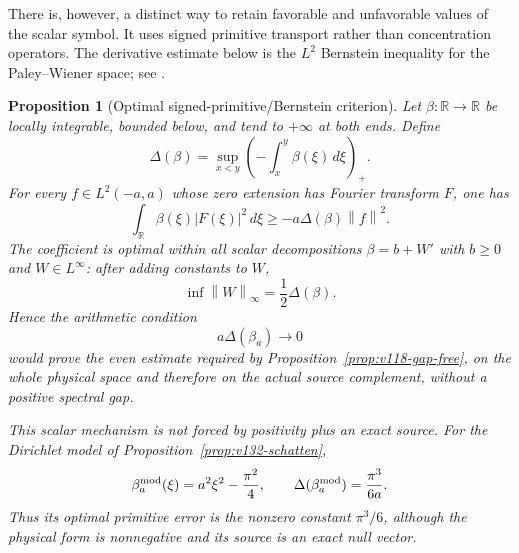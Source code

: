 \documentclass[11pt]{article}
\newtheorem{proposition}[theorem]{Proposition}
\theoremstyle{remark}
\newcommand{\norm}[1]{\left\lVert #1\right\rVert}
\begin{document}
There is, however, a distinct way to retain favorable and unfavorable
values of the scalar symbol.  It uses signed primitive transport rather
than concentration operators.  The derivative estimate below is the
$L^2$ Bernstein inequality for the Paley--Wiener space; see
\cite{Bang1995}.

\begin{proposition}[Optimal signed-primitive/Bernstein criterion]
\label{prop:v134-primitive}
Let $\beta:\mathbb R\to\mathbb R$ be locally integrable, bounded below,
and tend to $+\infty$ at both ends.  Define
\begin{equation}
 \Delta(\beta)=
 \sup_{x<y}\left(-\int_x^y\beta(\xi)\,d\xi\right)_+ .
 \label{eq:v134-drawdown}
\end{equation}
For every $f\in L^2(-a,a)$ whose zero extension has Fourier transform
$F$, one has
\begin{equation}
 \int_{\mathbb R}\beta(\xi)|F(\xi)|^2\,d\xi
 \ge-a\Delta(\beta)\norm f^2.                 \label{eq:v134-primitive-bound}
\end{equation}
The coefficient is optimal within all scalar decompositions
$\beta=b+W'$ with $b\ge0$ and $W\in L^\infty$: after adding constants
to $W$,
\begin{equation}
 \inf\norm W_\infty=\frac12\Delta(\beta).     \label{eq:v134-optimal}
\end{equation}
Hence the arithmetic condition
\begin{equation}
 a\Delta(\beta_a)\longrightarrow0             \label{eq:v134-open-lemma}
\end{equation}
would prove the even estimate required by
Proposition~\ref{prop:v118-gap-free}, on the whole physical space and
therefore on the actual source complement, without a positive spectral
gap.

This scalar mechanism is not forced by positivity plus an exact source.
For the Dirichlet model of Proposition~\ref{prop:v132-schatten},
\[
 \beta_a^{\rm mod}(\xi)=a^2\xi^2-\frac{\pi^2}{4},
 \qquad
 \Delta(\beta_a^{\rm mod})=\frac{\pi^3}{6a}.
\]
Thus its optimal primitive error is the nonzero constant $\pi^3/6$,
although the physical form is nonnegative and its source is an exact
null vector.
\end{proposition}
\end{document}
